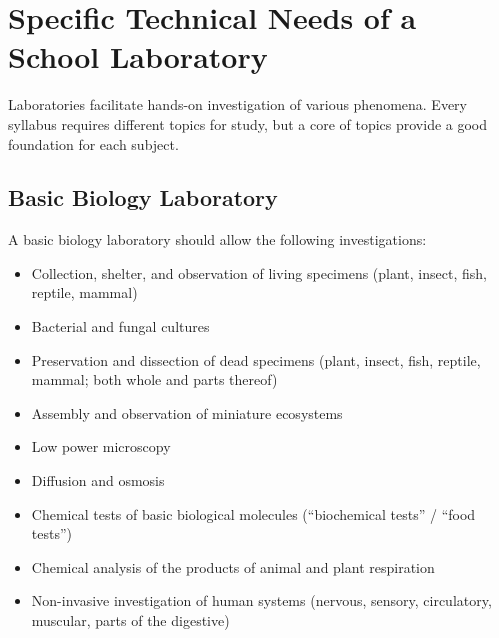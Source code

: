 \chapter{Specific Technical Needs of a School Laboratory}

Laboratories facilitate hands-on investigation of various phenomena. 
Every syllabus requires different topics for study, 
but a core of topics provide a good foundation for each subject.

\section{Basic Biology Laboratory}

A basic biology laboratory should allow the following investigations:
\begin{itemize}
\item{Collection, shelter, and observation of living specimens 
(plant, insect, fish, reptile, mammal)}
\item{Bacterial and fungal cultures}
\item{Preservation and dissection of dead specimens 
(plant, insect, fish, reptile, mammal; both whole and parts thereof)}
\item{Assembly and observation of miniature ecosystems}
\item{Low power microscopy}
\item{Diffusion and osmosis}
\item{Chemical tests of basic biological molecules 
(“biochemical tests” / “food tests”)}
\item{Chemical analysis of the products of animal and plant respiration}
\item{Non-invasive investigation of human systems 
(nervous, sensory, circulatory, muscular, parts of the digestive)}
\end{itemize}

